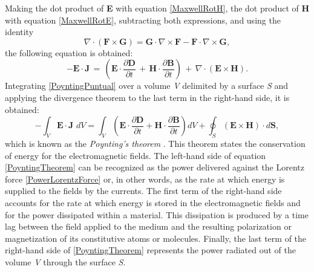 Making the dot product of \textbf{E} with equation \eqref{MaxwellRotH}, the dot product of \textbf{H} with
equation \eqref{MaxwellRotE}, subtracting both expressions, and using the identity
\begin{equation}
	\nabla\cdot\left(\mathbf{F}\times\mathbf{G}\right) = \mathbf{G}\cdot\nabla\times\mathbf{F} - \mathbf{F}\cdot\nabla\times\mathbf{G},
\end{equation}
the following equation is obtained:
\begin{equation}\label{PoyntingPuntual}
    -\mathbf{E}\cdot\mathbf{J}\,=\,\left(\mathbf{E}\cdot\frac{\partial\mathbf{D}}{\partial t}\,+\,\mathbf{H}\cdot\frac{\partial\mathbf{B}}{\partial t}\right)\,+\,\nabla\cdot\left(\mathbf{E}\times\mathbf{H}\right).
\end{equation}
Integrating \eqref{PoyntingPuntual} over a volume \emph{V} delimited by a surface \emph{S} and applying the divergence theorem to the last term in the right-hand side, it is obtained:
\begin{equation}\label{PoyntingTheorem}
    - \int_{V} \mathbf{E}\cdot\mathbf{J}\,\,dV = \int_{V} \left(\mathbf{E}\cdot\frac{\partial\mathbf{D}}{\partial t} + \mathbf{H}\cdot\frac{\partial\mathbf{B}}{\partial t}\right) dV + \oint_{S} \left(\mathbf{E}\times\mathbf{H}\right)\cdot d\mathbf{S},
\end{equation}
which is known as the \emph{Poynting's theorem} \cite{Poynting}. This theorem states the conservation of energy for the electromagnetic fields. The left-hand side of equation \eqref{PoyntingTheorem} can be recognized as the power delivered against the Lorentz force \eqref{PowerLorentzForce} or, in other words, as the rate at which energy is supplied to the fields by the currents. The first term of the right-hand side accounts for the rate at which energy is stored in the electromagnetic fields and for the power dissipated within a material. This dissipation is produced by a time lag between the field applied to the medium and the resulting polarization or magnetization of its constitutive atoms or molecules. Finally, the last term of the right-hand side of \eqref{PoyntingTheorem} represents the power radiated out of the volume \emph{V} through the surface \emph{S}.

